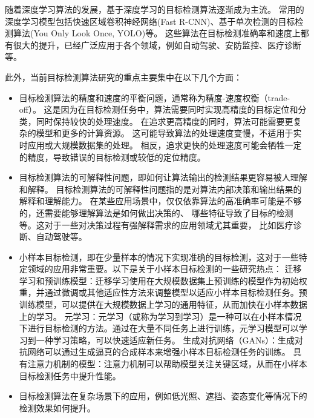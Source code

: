 随着深度学习算法的发展，基于深度学习的目标检测算法逐渐成为主流。
常用的深度学习模型包括快速区域卷积神经网络(Fast R-CNN)\cite{girshick2015fast}、基于单次检测的目标检测算法(You Only Look Once, YOLO)\cite{jiang2022review}等。
这些算法在目标检测准确率和速度上都有很大的提升，已经广泛应用于各个领域，例如自动驾驶、安防监控、医疗诊断等。
\par
此外，当前目标检测算法研究的重点主要集中在以下几个方面：
\begin{itemize}[itemindent=2em]
    \item 目标检测算法的精度和速度的平衡问题，通常称为精度-速度权衡（trade-off）。
    这是因为在目标检测任务中，算法需要同时实现高精度的目标定位和分类，同时保持较快的处理速度。
    在追求更高精度的同时，算法可能需要更复杂的模型和更多的计算资源。
    这可能导致算法的处理速度变慢，不适用于实时应用或大规模数据集的处理。
    相反，追求更快的处理速度可能会牺牲一定的精度，导致错误的目标检测或较低的定位精度。
    
    \item 目标检测算法的可解释性问题，即如何让算法输出的检测结果更容易被人理解和解释。
    目标检测算法的可解释性问题指的是对算法内部决策和输出结果的解释和理解能力。
    在某些应用场景中，仅仅依靠算法的高准确率可能是不够的，还需要能够理解算法是如何做出决策的、
    哪些特征导致了目标的检测等。这对于一些对决策过程有强解释需求的应用领域尤其重要，
    比如医疗诊断、自动驾驶等。
    
    \item 小样本目标检测，即在少量样本的情况下实现准确的目标检测，这对于一些特定领域的应用非常重要。以下是关于小样本目标检测的一些研究热点：
    迁移学习和预训练模型\cite{zhuang2020comprehensive}：迁移学习使用在大规模数据集上预训练的模型作为初始权重，并通过微调或其他适应性方法来调整模型以适应小样本目标检测任务。预训练模型，可以提供在大规模数据上学习的通用特征，从而加快在小样本数据上的学习。
    元学习\cite{hospedales2021meta}：元学习（或称为学习到学习）是一种可以在小样本情况下进行目标检测的方法。通过在大量不同任务上进行训练，元学习模型可以学习到一种学习策略，可以快速适应新任务。
    生成对抗网络（GANs）：生成对抗网络可以通过生成逼真的合成样本来增强小样本目标检测任务的训练。
    具有注意力机制的模型：注意力机制可以帮助模型关注关键区域，从而在小样本目标检测任务中提升性能。
    
    \item 目标检测算法在复杂场景下的应用，例如低光照、遮挡、姿态变化等情况下的检测效果如何提升。
    
\end{itemize}


